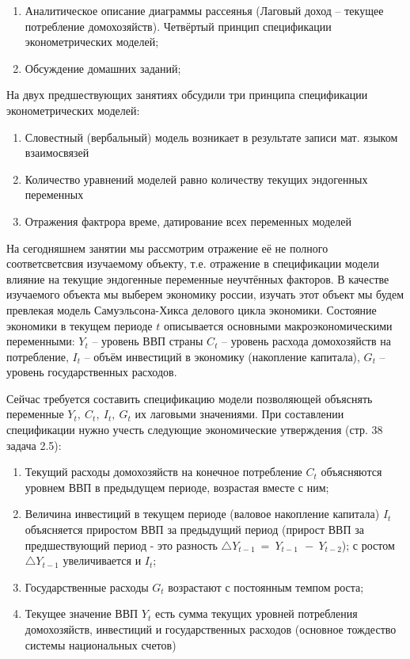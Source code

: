 \documentclass[12pt,a4paper]{article}
\author{GH-TIMe}
\begin{document}
\begin{enumerate}
\item Аналитическое описание диаграммы рассеянья (Лаговый доход -- текущее потребление домохозяйств). Четвёртый принцип спецификации эконометрических моделей;
\item Обсуждение домашних заданий;
\end{enumerate}

На двух предшествующих занятиях обсудили три принципа спецификации эконометрических моделей:
\begin{enumerate}
\item Словестный (вербальный) модель возникает в результате записи мат. языком взаимосвязей
\item Количество уравнений моделей равно количеству текущих эндогенных переменных
\item Отражения фактрора време, датирование всех переменных моделей
\end{enumerate}

На сегодняшнем занятии мы рассмотрим отражение её не полного соответсветсвия изучаемому объекту, т.е. отражение в спецификации модели влияние на текущие эндогенные переменные неучтённых факторов. В качестве изучаемого объекта мы выберем экономику россии, изучать этот объект мы будем превлекая модель Самуэльсона-Хикса делового цикла экономики. Состояние экономики в текущем периоде $t$ описывается основными макроэкономическими переменными: $Y_t$ -- уровень ВВП страны $C_t$ -- уровень расхода домохозяйств на потребление, $I_t$ -- объём инвестиций в экономику (накопление капитала), $G_t$ -- уровень государственных расходов.

Сейчас требуется составить спецификацию модели позволяющей объяснять переменные $\displaystyle Y_{t} ,\ C_{t} ,\ I_{t} ,\ G_{t}$ их лаговыми значениями. При составлении спецификации нужно учесть следующие экономические утверждения (стр. 38 задача 2.5):
\begin{enumerate}
\item Текущий расходы домохозяйств на конечное потребление $\displaystyle C_{t}$ объясняются уровнем ВВП в предыдущем периоде, возрастая вместе с ним;
\item Величина инвестиций в текущем периоде (валовое накопление капитала) $\displaystyle I_{t}$ объясняется приростом ВВП за предыдущий период (прирост ВВП за предшествующий период - это разность $\displaystyle \triangle Y_{t-1} \ =\ Y_{t-1\ } \ -\ Y_{t-2}$); с ростом $\displaystyle \triangle Y_{t-1}$ увеличивается и $\displaystyle I_{t}$;
\item Государственные расходы $\displaystyle G_{t}$ возрастают с постоянным темпом роста;
\item Текущее значение ВВП $\displaystyle Y_{t}$ есть сумма текущих уровней потребления домохозяйств, инвестиций и государственных расходов (основное тождество системы национальных счетов)
\end{enumerate}
\end{document}
